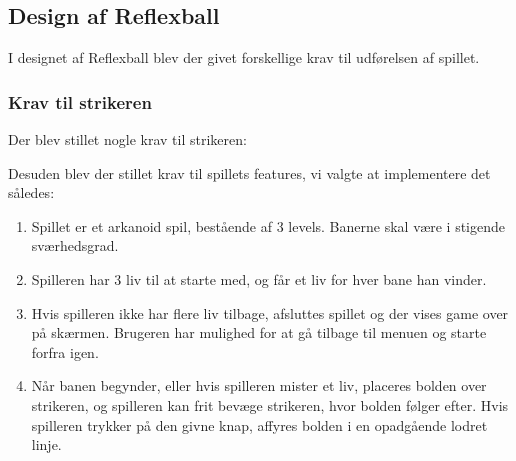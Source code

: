 \subsection{Design af Reflexball}
I designet af Reflexball blev der givet forskellige krav til udførelsen af spillet.

\subsubsection{Krav til strikeren}
Der blev stillet nogle krav til strikeren:

Desuden blev der stillet krav til spillets features, vi valgte at implementere det således:
\begin{enumerate}
\item Spillet er et arkanoid spil, bestående af 3 levels. Banerne skal være i stigende sværhedsgrad.
\item Spilleren har 3 liv til at starte med, og får et liv for hver bane han vinder.
\item Hvis spilleren ikke har flere liv tilbage, afsluttes spillet og der vises game over på skærmen. Brugeren har mulighed for at gå tilbage til menuen og starte forfra igen.
\item Når banen begynder, eller hvis spilleren mister et liv, placeres bolden over strikeren, og spilleren kan frit bevæge strikeren, hvor bolden følger efter. Hvis spilleren trykker på den givne knap, affyres bolden i en opadgående lodret linje. 
\end{enumerate}

